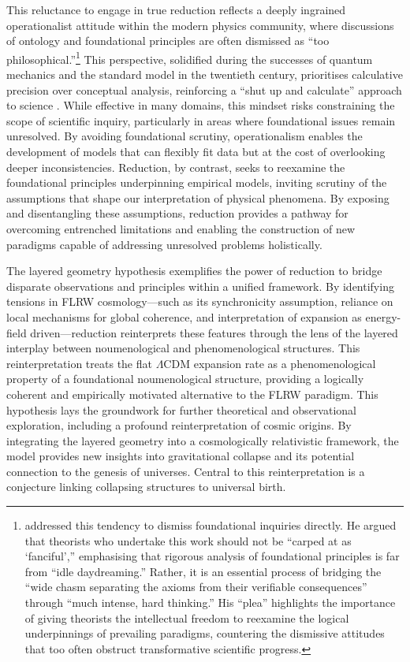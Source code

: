 \documentclass[aps,rmp,groupedaddress,twocolumn,10pt]{revtex4-2}
\begin{document}
This reluctance to engage in true reduction reflects a deeply ingrained operationalist attitude within the modern physics community, where discussions of ontology and foundational principles are often dismissed as ``too philosophical.''\footnote{\citet{Einstein1954} addressed this tendency to dismiss foundational inquiries directly. He argued that theorists who undertake this work should not be ``carped at as `fanciful','' emphasising that rigorous analysis of foundational principles is far from ``idle daydreaming.'' Rather, it is an essential process of bridging the ``wide chasm separating the axioms from their verifiable consequences'' through ``much intense, hard thinking.'' His ``plea'' highlights the importance of giving theorists the intellectual freedom to reexamine the logical underpinnings of prevailing paradigms, countering the dismissive attitudes that too often obstruct transformative scientific progress.} This perspective, solidified during the successes of quantum mechanics and the standard model in the twentieth century, prioritises calculative precision over conceptual analysis, reinforcing a ``shut up and calculate'' approach to science \cite{Mermin2004}. While effective in many domains, this mindset risks constraining the scope of scientific inquiry, particularly in areas where foundational issues remain unresolved. By avoiding foundational scrutiny, operationalism enables the development of models that can flexibly fit data but at the cost of overlooking deeper inconsistencies. Reduction, by contrast, seeks to reexamine the foundational principles underpinning empirical models, inviting scrutiny of the assumptions that shape our interpretation of physical phenomena. By exposing and disentangling these assumptions, reduction provides a pathway for overcoming entrenched limitations and enabling the construction of new paradigms capable of addressing unresolved problems holistically.

The layered geometry hypothesis exemplifies the power of reduction to bridge disparate observations and principles within a unified framework. By identifying tensions in FLRW cosmology---such as its synchronicity assumption, reliance on local mechanisms for global coherence, and interpretation of expansion as energy-field driven---reduction reinterprets these features through the lens of the layered interplay between noumenological and phenomenological structures. This reinterpretation treats the flat $\Lambda$CDM expansion rate as a phenomenological property of a foundational noumenological structure, providing a logically coherent and empirically motivated alternative to the FLRW paradigm. This hypothesis lays the groundwork for further theoretical and observational exploration, including a profound reinterpretation of cosmic origins. By integrating the layered geometry into a cosmologically relativistic framework, the model provides new insights into gravitational collapse and its potential connection to the genesis of universes. Central to this reinterpretation is a conjecture linking collapsing structures to universal birth.
\end{document}
